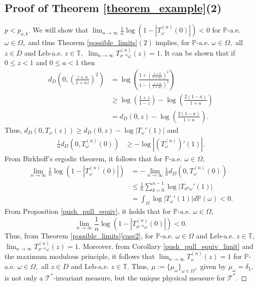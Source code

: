 \documentclass[12pt,reqno]{amsart}
\numberwithin{theorem}{section}
\begin{document}
\subsection{Proof of Theorem \ref{theorem_example}(2)}
\begin{proof}[$p<p_{a,b}$]
    We will show that $\lim_{n\to\infty}\frac{1}{n}\log(1-|T_{\omega}^{(n)}(0)|)<0$ for $\mathbb{P}$-a.e. $\omega\in\Omega,$ and thus Theorem \ref{possible_limits}$(2)$ implies, for $\mathbb{P}$-a.e. $\omega\in\Omega,$ all $z\in D$ and $\text{Leb}$-a.e. $z\in\mathbb{T},$ $\lim_{n\to\infty}T_{\sigma^{-n}\omega}^{(n)}(z)=1.$ It can be shown that if $0\le z<1$ and $0\le a<1$ then \begin{align*}d_{D}\left(0,\left(\frac{z+a}{1+az}\right)^2\right)&=\log\left(\frac{1+\left(\frac{z+a}{1+az}\right)^2}{1-\left(\frac{z+a}{1+az}\right)^2}\right)\\&\ge\log\left(\frac{1+z}{1-z}\right)-\log\left(\frac{2(1-a)}{1+a}\right)\\&=d_{D}(0,z)-\log\left(\frac{2(1-a)}{1+a}\right).\end{align*} Thus, $d_{D}(0,T_{\omega}(z))\ge d_{D}(0,z)-\log|T_{\omega}'(1)|$ and \begin{align*}
        \frac{1}{n}d_{D}(0,T_{\omega}^{(n)}(0))&\ge-\log|(T_{\omega}^{(n)})'(1)|.
    \end{align*} From Birkhoff's ergodic theorem, it follows that for $\mathbb{P}$-a.e. $\omega\in\Omega,$ \begin{align*}\lim_{n\to\infty}\frac{1}{n}\log(1-|T_{\omega}^{(n)}(0)|)&=-\lim_{n\to\infty}\frac{1}{n}d_{D}(0, T_{\omega}^{(n)}(0))\\&\le\frac{1}{n}\sum_{k=0}^{n-1}\log|T_{\sigma^{k}\omega}'(1)|\\&=\int_{\Omega}\log|T_{\omega}'(1)|d\mathbb{P}(\omega)<0.\end{align*} From Proposition \ref{push_pull_equiv}, it holds that for $\mathbb{P}$-a.e. $\omega\in\Omega,$ $$\lim_{n\to\infty}\frac{1}{n}\log(1-|T_{\sigma^{-n}\omega}^{(n)}(0)|)<0.$$ Thus, from Theorem \ref{possible_limits}\ref{case2}, for $\mathbb{P}$-a.e. $\omega\in\Omega$ and $\text{Leb}$-a.e. $z\in\mathbb{T},$ $\lim_{n\to\infty}T_{\sigma^{-n}\omega}^{(n)}(z)=1.$ Moreover, from Corollary \ref{push_pull_equiv_limit} and the maximum modulous principle, it follows that $\lim_{n\to\infty}T_{\omega}^{(n)}(z)=1$ for $\mathbb{P}$-a.e. $\omega\in\Omega,$ all $z\in D$ and $\text{Leb}$-a.e. $z\in\mathbb{T}.$ Thus, $\mu:=\{\mu_{\omega}\}_{\omega\in\Omega},$ given by $\mu_{\omega}=\delta_{1},$ is not only a $\mathcal{T}^{*}$-invariant measure, but the unique physical measure for $\mathcal{T}^{*}.$
\end{proof}
\end{document}
